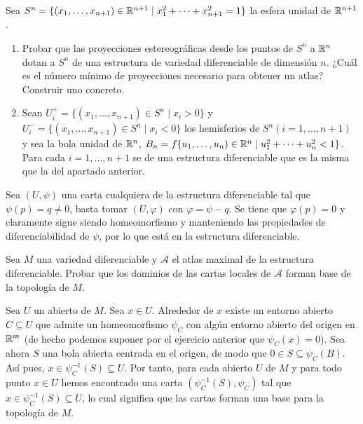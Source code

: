 \documentclass[twoside]{article}
\begin{document}
\begin{ejercicio}{2}
Sea $S^n = \{(x_1,\dots, x_{n+1})\in \mathbb{R}^{n+1}\mid x^2_1
+\cdots+x^2_{n+1} = 1\}$ la esfera
unidad de $\mathbb{R}^{n+1}$.\
\begin{enumerate}
\item Probar que las proyecciones estereográficas desde los puntos de $S^n$ a $\mathbb{R}^n$
dotan a $S^n$ de una estructura de variedad diferenciable de dimensión $n$.
¿Cuál es el número mínimo de proyecciones necesario para obtener un atlas?
Construir uno concreto.
\item Sean $U^+_i = \{(x_1, \dots, x_{n+1}) \in S^n\mid x_i > 0\}$ y $U^-_i = \{(x_1, \dots, x_{n+1}) \in S^n\mid x_i <
0\}$ los hemisferios de $S^n (i = 1,\dots, n + 1)$ y sea la bola unidad de $\mathbb{R}^n$,
$B_n = f\{u_1,\dots, u_n) \in \mathbb{R}^n\mid u^2_1
+ \cdots + u^2_n < 1\}$. Para cada $i = 1, \dots, n + 1$ se
de una estructura diferenciable que es la misma que la del apartado anterior.
\end{enumerate}
\end{ejercicio}
\begin{solucion}
Sea $(U,\psi)$ una carta cualquiera de la estructura diferenciable tal que $\psi(p)=q\neq 0$, basta tomar $(U,\varphi)$ con $\varphi=\psi-q$. Se tiene que $\varphi(p)=0$ y claramente sigue siendo homeomorfismo y manteniendo las propiedades de diferenciabilidad de $\psi$, por lo que está en la estructura diferenciable.
\end{solucion}

\begin{ejercicio}{3}
Sea $M$ una variedad diferenciable y $\mathcal{A}$ el atlas maximal de la estructura
diferenciable. Probar que los dominios de las cartas locales de $\mathcal{A}$ forman
base de la topología de $M$.
\end{ejercicio}
\begin{solucion}
Sea $U$ un abierto de $M$. Sea $x\in U$. Alrededor de $x$ existe un entorno abierto $C\subseteq U$ que admite un homeomorfismo $\psi_C$ con algún entorno abierto del origen en $\mathbb{R}^m$ (de hecho podemos suponer por el ejercicio anterior que $\psi_C(x)=0$). Sea ahora $S$ una bola abierta centrada en el origen, de modo que $0\in S\subseteq \psi_C(B)$. Así pues, $x\in\psi_C^{-1}(S)\subseteq U$. Por tanto, para cada abierto $U$ de $M$ y para todo punto $x\in U$ hemos encontrado una carta $(\psi_C^{-1}(S),\psi_C)$ tal que $x\in\psi_C^{-1}(S)\subseteq U$, lo cual significa que las cartas forman una base para la topología de $M$.
\end{solucion}
\end{document}
